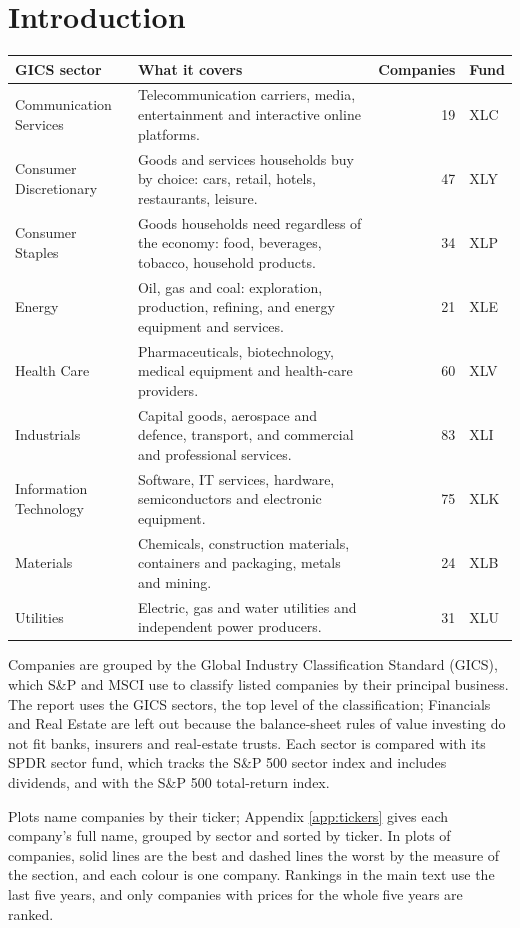 \documentclass[11pt,a4paper]{article}
\begin{document}
\section{Introduction}
\label{sec:introduction}
\begin{table}[H]
\centering
\small
\begin{tabular}{p{3.4cm}p{8.6cm}rl}
\hline
GICS sector & What it covers & Companies & Fund \\
\hline
Communication Services & Telecommunication carriers, media, entertainment and interactive online platforms. & 19 & XLC \\
Consumer Discretionary & Goods and services households buy by choice: cars, retail, hotels, restaurants, leisure. & 47 & XLY \\
Consumer Staples & Goods households need regardless of the economy: food, beverages, tobacco, household products. & 34 & XLP \\
Energy & Oil, gas and coal: exploration, production, refining, and energy equipment and services. & 21 & XLE \\
Health Care & Pharmaceuticals, biotechnology, medical equipment and health-care providers. & 60 & XLV \\
Industrials & Capital goods, aerospace and defence, transport, and commercial and professional services. & 83 & XLI \\
Information Technology & Software, IT services, hardware, semiconductors and electronic equipment. & 75 & XLK \\
Materials & Chemicals, construction materials, containers and packaging, metals and mining. & 24 & XLB \\
Utilities & Electric, gas and water utilities and independent power producers. & 31 & XLU \\
\hline
\end{tabular}
\end{table}
Companies are grouped by the Global Industry Classification Standard (GICS), which S\&P and MSCI use to classify listed companies by their principal business. The report uses the GICS sectors, the top level of the classification; Financials and Real Estate are left out because the balance-sheet rules of value investing do not fit banks, insurers and real-estate trusts. Each sector is compared with its SPDR sector fund, which tracks the S\&P 500 sector index and includes dividends, and with the S\&P 500 total-return index.

Plots name companies by their ticker; Appendix \ref{app:tickers} gives each company's full name, grouped by sector and sorted by ticker. In plots of companies, solid lines are the best and dashed lines the worst by the measure of the section, and each colour is one company. Rankings in the main text use the last five years, and only companies with prices for the whole five years are ranked.
\end{document}
